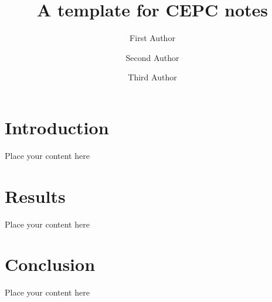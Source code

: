 \documentclass[coverpage]{cepcnote} %
\title{A template for CEPC notes}
\author[a]{First Author}
\author[a]{Second Author}
\author[b]{Third Author}
\affil[a]{One Institution}
\affil[b]{Another Institution}
\begin{document}
% 

\section{Introduction}

{\color{red} Place your content here}

\section{Results}

Place your content here

\section{Conclusion}

Place your content here
\end{document}
